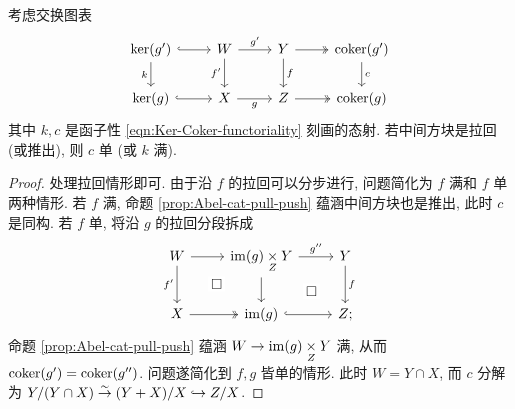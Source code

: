 \begin{corollary}\label{prop:Abel-cat-Coker-pull}
	考虑交换图表
	\[\begin{tikzcd}
		\Ker(g') \arrow[hookrightarrow, r] \arrow[d, "k"'] & W \arrow[r, "{g'}"] \arrow[d, "{f'}"'] & Y \arrow[d, "f"] \arrow[twoheadrightarrow, r] & \Coker(g') \arrow[d, "c"] \\
		\Ker(g) \arrow[hookrightarrow, r] & X \arrow[r, "g"'] & Z \arrow[twoheadrightarrow, r] & \Coker(g)
	\end{tikzcd}\]
	其中 $k, c$ 是函子性 \eqref{eqn:Ker-Coker-functoriality} 刻画的态射. 若中间方块是拉回 (或推出), 则 $c$ 单 (或 $k$ 满).
\end{corollary}
\begin{proof}
	处理拉回情形即可. 由于沿 $f$ 的拉回可以分步进行, 问题简化为 $f$ 满和 $f$ 单两种情形. 若 $f$ 满, 命题 \ref{prop:Abel-cat-pull-push} 蕴涵中间方块也是推出, 此时 $c$ 是同构. 若 $f$ 单, 将沿 $g$ 的拉回分段拆成
	\[\begin{tikzcd}
		W \arrow[d, "{f'}"'] \arrow[r] & \Image(g) \dtimes{Z} Y \arrow[r, "{g''}"] \arrow[d] & Y \arrow[d, "f"] \\
		X \arrow[twoheadrightarrow, r] & \Image(g) \arrow[hookrightarrow, r] \arrow[phantom, lu, "\Box" description] & Z ; \arrow[phantom, lu, "\Box" description]
	\end{tikzcd}\]
	命题 \ref{prop:Abel-cat-pull-push} 蕴涵 $W \to \operatorname{im}(g) \underset{Z}{\times} Y$ 满, 从而 $\operatorname{coker}(g') = \operatorname{coker}(g'')$. 问题遂简化到 $f, g$ 皆单的情形. 此时 $W = Y \cap X$, 而 $c$ 分解为 $Y/(Y \cap X) \stackrel{\sim}{\rightarrow} (Y+X)/X \hookrightarrow Z/X$.
\end{proof}

